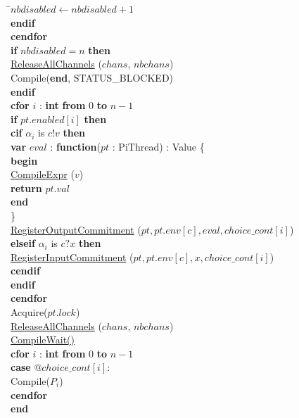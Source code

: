 \documentclass[a4paper,11pt]{article}
\newenvironment{program}{
  \begin{sffamily}
  \begin{scriptsize}
  \begin{tabbing}}
 {\end{tabbing}
  \end{scriptsize}
  \end{sffamily}}
\newcommand{\kw}[1]{\textsf{\textbf{#1}}}
\newcommand{\pindent}{\hspace{2em}\=}
\newcommand{\compiletime}[1]{\textcolor{compilecolor}{#1}}
\newcommand{\synchro}[1]{\textcolor{synchrocolor}{#1}}
\newcommand{\myref}[1]{
  \hyperref[#1]{#1}
}
\begin{document}
\begin{program}
  \>\>\pindent$nbdisabled \leftarrow nbdisabled + 1$ \\
  \>\>\kw{endif} \\
  \>\compiletime{\kw{cendfor}} \\
  \>\kw{if} $nbdisabled = n$ \kw{then} \\
  \>\pindent\synchro{\myref{ReleaseAllChannels}($chans$, $nbchans$)} \\
  \>\>\compiletime{Compile(\kw{end}, STATUS\_BLOCKED)} \\
  \>\kw{endif} \\
  \>\compiletime{\kw{cfor} $i$ : \kw{int} \kw{from} $0$ \kw{to} $n-1$} \\
  \>\pindent\kw{if} $pt.enabled[i]$ \kw{then} \\
  \>\>\pindent\compiletime{\kw{cif} $\alpha_i$ is $c!v$ \kw{then}} \\
  \>\>\>\pindent\kw{var} $eval$ : \kw{function}($pt$ : PiThread) : Value \{ \\
  \>\>\>\>\pindent\kw{begin} \\
  \>\>\>\>\>\pindent\compiletime{\myref{CompileExpr}($v$)} \\
  \>\>\>\>\>\>\kw{return} $pt.val$ \\
  \>\>\>\>\>\kw{end} \\
  \>\>\>\>\} \\
  \>\>\>\>\myref{RegisterOutputCommitment}($pt, pt.env[c], eval, choice\_cont[i]$) \\
  \>\>\>\compiletime{\kw{elseif} $\alpha_i$ is $c?x$ \kw{then}} \\
  \>\>\>\pindent\myref{RegisterInputCommitment}($pt, pt.env[c], x, choice\_cont[i]$) \\
  \>\>\>\compiletime{\kw{cendif}} \\
  \>\>\kw{endif} \\
  \>\compiletime{\kw{cendfor}} \\
  \>\synchro{Acquire($pt.lock$)} \\
  \>\synchro{\myref{ReleaseAllChannels}($chans$, $nbchans$)} \\
  \>\compiletime{\myref{CompileWait()}} \\
  \>\compiletime{\kw{cfor} $i$ : \kw{int} \kw{from} $0$ \kw{to} $n-1$} \\
  \>\pindent \kw{case} $@choice\_cont[i]:$ \\
  \>\>\compiletime{Compile($P_i$)} \\
  \>\compiletime{\kw{cendfor}} \\
  \kw{end}
\end{program}
\end{document}
